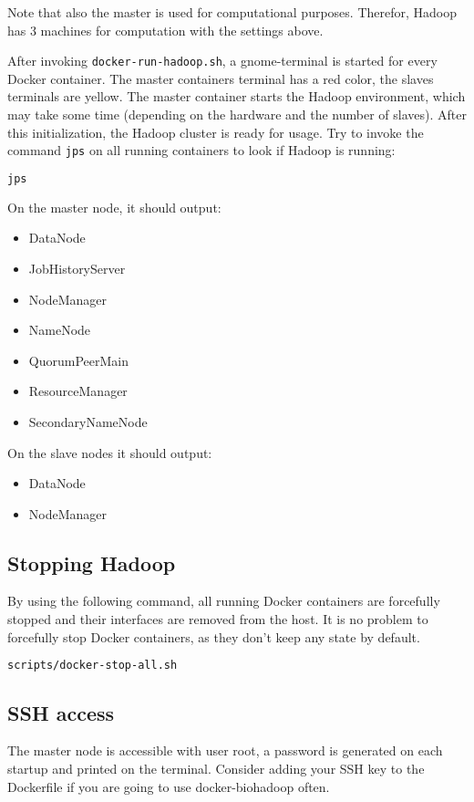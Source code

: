 Note that also the master is used for computational purposes. Therefor, Hadoop has 3 machines for computation with the settings above.

After invoking \texttt{docker-run-hadoop.sh}, a gnome-terminal is started for every Docker container. The master containers terminal has a red color, the slaves terminals are yellow. The master container starts the Hadoop environment, which may take some time (depending on the hardware and the number of slaves). After this initialization, the Hadoop cluster is ready for usage. Try to invoke the command \texttt{jps} on all running containers to look if Hadoop is running:

\begin{lstlisting}[language=bash]
jps
\end{lstlisting}

On the master node, it should output:
\begin{itemize}
  \item DataNode
  \item JobHistoryServer
  \item NodeManager
  \item NameNode
  \item QuorumPeerMain
  \item ResourceManager
  \item SecondaryNameNode
\end{itemize}

On the slave nodes it should output:
\begin{itemize}
  \item DataNode
  \item NodeManager
\end{itemize}

\subsection{Stopping Hadoop}
By using the following command, all running Docker containers are forcefully stopped and their interfaces are removed from the host. It is no problem to forcefully stop Docker containers, as they don't keep any state by default.
\begin{lstlisting}[language=bash]
scripts/docker-stop-all.sh
\end{lstlisting}

\subsection{SSH access}
The master node is accessible with user root, a password is generated on each startup and printed on the terminal. Consider adding your SSH key to the Dockerfile if you are going to use docker-biohadoop often.